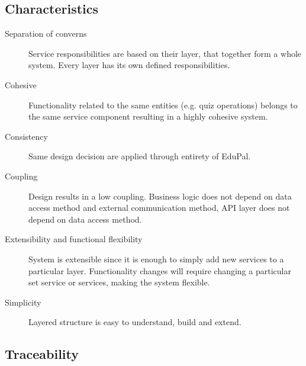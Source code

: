 \subsection{Characteristics}

\begin{description}
  \item[Separation of converns] Service responsibilities are based on their layer, that together form a whole system. Every layer has its own defined responsibilities.
  \item[Cohesive] Functionality related to the same entities (e.g. quiz operations) belongs to the same service component resulting in a highly cohesive system.
  \item[Consistency] Same design decision are applied through entirety of EduPal.
  \item[Coupling] Design results in a low coupling. Business logic does not depend on data access method and external communication method, API layer does not depend on data access method.
  \item[Extensibility and functional flexibility] System is extensible since it is enough to simply add new services to a particular layer. Functionality changes will require changing a particular set service or services, making the system flexible.
  \item[Simplicity] Layered structure is easy to understand, build and extend.
\end{description}
  
\subsection{Traceability}

